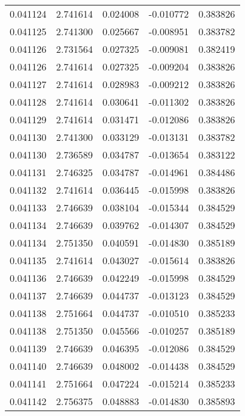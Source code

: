 \begin{tabular}{lrrrr}
0.041124    &  2.741614 &  0.024008 & -0.010772 &             0.383826 \\
0.041125    &  2.741300 &  0.025667 & -0.008951 &             0.383782 \\
0.041126    &  2.731564 &  0.027325 & -0.009081 &             0.382419 \\
0.041126    &  2.741614 &  0.027325 & -0.009204 &             0.383826 \\
0.041127    &  2.741614 &  0.028983 & -0.009212 &             0.383826 \\
0.041128    &  2.741614 &  0.030641 & -0.011302 &             0.383826 \\
0.041129    &  2.741614 &  0.031471 & -0.012086 &             0.383826 \\
0.041130    &  2.741300 &  0.033129 & -0.013131 &             0.383782 \\
0.041130    &  2.736589 &  0.034787 & -0.013654 &             0.383122 \\
0.041131    &  2.746325 &  0.034787 & -0.014961 &             0.384486 \\
0.041132    &  2.741614 &  0.036445 & -0.015998 &             0.383826 \\
0.041133    &  2.746639 &  0.038104 & -0.015344 &             0.384529 \\
0.041134    &  2.746639 &  0.039762 & -0.014307 &             0.384529 \\
0.041134    &  2.751350 &  0.040591 & -0.014830 &             0.385189 \\
0.041135    &  2.741614 &  0.043027 & -0.015614 &             0.383826 \\
0.041136    &  2.746639 &  0.042249 & -0.015998 &             0.384529 \\
0.041137    &  2.746639 &  0.044737 & -0.013123 &             0.384529 \\
0.041138    &  2.751664 &  0.044737 & -0.010510 &             0.385233 \\
0.041138    &  2.751350 &  0.045566 & -0.010257 &             0.385189 \\
0.041139    &  2.746639 &  0.046395 & -0.012086 &             0.384529 \\
0.041140    &  2.746639 &  0.048002 & -0.014438 &             0.384529 \\
0.041141    &  2.751664 &  0.047224 & -0.015214 &             0.385233 \\
0.041142    &  2.756375 &  0.048883 & -0.014830 &             0.385893 \\

\end{tabular}

